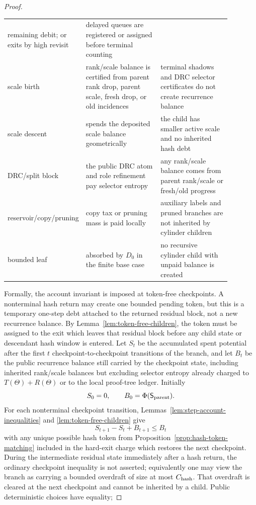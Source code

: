 \documentclass[11pt]{article}
\begin{document}
\begin{proof}
\begin{center}
\begin{tabular}{p{0.22\linewidth}p{0.34\linewidth}p{0.32\linewidth}}
remaining debit; or exits by high revisit
& delayed queues are registered or assigned before terminal counting\\
scale birth
& rank/scale balance is certified from parent rank drop, parent scale, fresh
drop, or old incidences
& terminal shadows and DRC selector certificates do not create recurrence
balance\\
scale descent
& spends the deposited scale balance geometrically
& the child has smaller active scale and no inherited hash debt\\
DRC/split block
& the public DRC atom and role refinement pay selector entropy
& any rank/scale balance comes from parent rank/scale or fresh/old progress\\
reservoir/copy/pruning
& copy tax or pruning mass is paid locally
& auxiliary labels and pruned branches are not inherited by cylinder children\\
bounded leaf
& absorbed by $D_0$ in the finite base case
& no recursive cylinder child with unpaid balance is created
\end{tabular}
\end{center}
Formally, the account invariant is imposed at token-free checkpoints.  A
nonterminal hash return may create one bounded pending token, but this is a
temporary one-step debt attached to the returned residual block, not a new
recurrence balance.  By Lemma~\ref{lem:token-free-children}, the token must be
assigned to the exit which leaves that residual block before any child state or
descendant hash window is entered.  Let $S_t$ be the accumulated spent potential
after the first $t$ checkpoint-to-checkpoint transitions of the branch, and let
$B_t$ be the public recurrence balance still carried by the checkpoint state,
including inherited rank/scale balances but excluding selector entropy already
charged to $T(\Theta)+R(\Theta)$ or to the local proof-tree ledger.  Initially
\[
  S_0=0,\qquad B_0=\Phi(\mathsf S_{\rm parent}).
\]
For each nonterminal checkpoint transition, Lemmas~\ref{lem:step-account-inequalities}
and \ref{lem:token-free-children}
give
\[
  S_{t+1}-S_t+B_{t+1}\le B_t
\]
with any unique possible hash token from
Proposition~\ref{prop:hash-token-matching} included in the hard-exit charge
which restores the next checkpoint.  During the intermediate residual state
immediately after a hash return, the ordinary checkpoint inequality is not
asserted; equivalently one may view the branch as carrying a bounded overdraft
of size at most $C_{\rm hash}$.  That overdraft is cleared at the next checkpoint
and cannot be inherited by a child.  Public deterministic choices have equality;

\end{proof}
\end{document}
